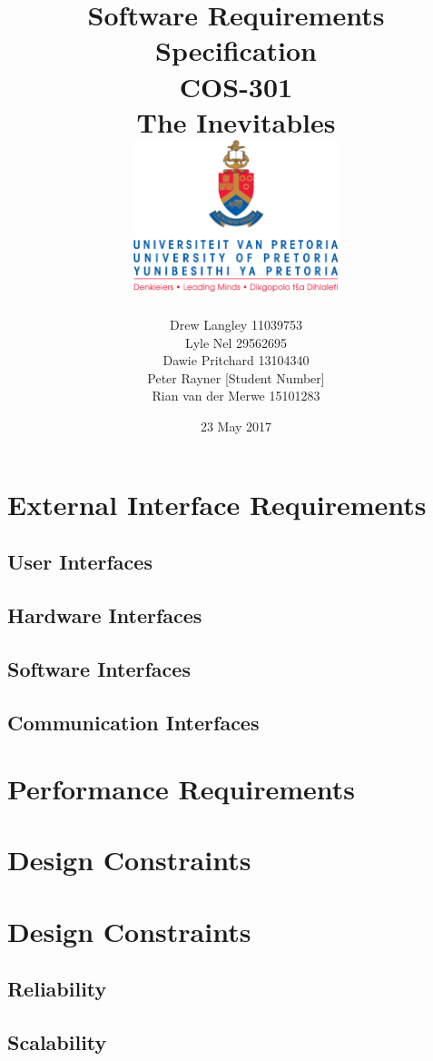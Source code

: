 \documentclass{article}
\title{ Software Requirements Specification \\ COS-301 \\ The Inevitables \\[0.5cm] \includegraphics[width=6cm]{front-page}}
\author{Drew Langley \hfill 11039753 \\ Lyle Nel \hfill 29562695 \\ Dawie Pritchard \hfill 13104340 \\  Peter Rayner \hfill [Student Number]\\ Rian van der Merwe \hfill 15101283 }
\date{23 May 2017}
\begin{document}
\maketitle
\pagebreak
\tableofcontents
\pagebreak

\section{External Interface Requirements}
	\subsection{User Interfaces}
	
	
	\subsection{Hardware Interfaces}
	
	
	
	\subsection{Software Interfaces}
	
	
	
	\subsection{Communication Interfaces}
	
	
	
\pagebreak	
\section{Performance Requirements}


\pagebreak
\section{Design Constraints}



\pagebreak
\section{ Design Constraints}
	\subsection{Reliability}
	
	
	
	\subsection{Scalability}
	
\end{document}
